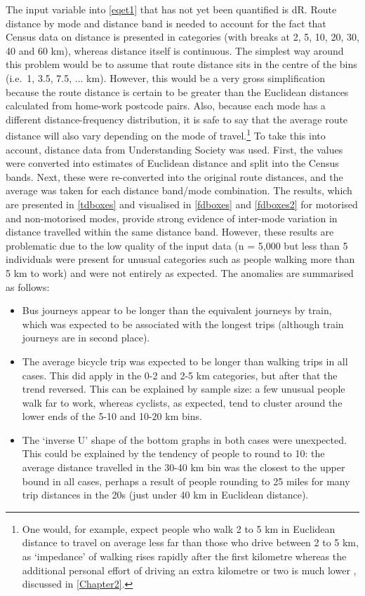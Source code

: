 The input variable into \cref{eqet1} that has not yet been quantified is
dR. Route distance by mode and distance band
is needed to account for the fact that Census data on distance is presented in
categories (with breaks at 2, 5, 10, 20, 30, 40 and 60 km), whereas distance
itself is continuous. The simplest way around this problem would be to
assume that route distance sits in the centre of the bins (i.e.~1, 3.5, 7.5, ...
km). However, this would be a very gross simplification because the route distance
is certain to be greater than the Euclidean distances calculated from
home-work postcode pairs. Also, because each mode has a different
distance-frequency distribution,
it is safe to say that the average route distance will also vary depending
on the mode of travel.\footnote{One would, for example,
expect people who walk 2 to 5
km in Euclidean distance to travel on average less far than those who drive
between 2 to 5 km, as `impedance' of walking rises rapidly after the first
kilometre whereas the additional personal effort of driving
an extra kilometre or two is much lower
\citep{Iacono2010}, discussed in \cref{Chapter2}.
}
To take this into account, distance data from Understanding Society was used.
First, the values were converted into estimates of Euclidean distance and
split into the Census bands. Next, these were re-converted into the original
route distances, and the average was taken for each distance band/mode
combination. The results, which are presented in \cref{tdboxes} and visualised in 
\cref{fdboxes} and \cref{fdboxes2} for motorised and non-motorised modes,
provide strong evidence of inter-mode variation in distance travelled within
the same distance band. However, these results are problematic due to the
low quality of the input data (n = 5,000 but less than 5 individuals
were present for unusual
categories such as people walking more than 5 km to work) and were not entirely
as expected. The anomalies are summarised as follows:
\begin{itemize}
 \item Bus journeys appear to be longer than the equivalent journeys by train,
 which was expected to be associated with the longest trips (although train
 journeys are in second place).
 \item The average bicycle trip was expected to be longer than walking trips
 in all cases. This did apply in the 0-2 and 2-5 km categories, but after that
 the trend reversed. This can be explained by sample size: a few unusual people
 walk far to work, whereas cyclists, as expected, tend to cluster around the lower
 ends of the 5-10 and 10-20 km bins.
 \item The `inverse U' shape of the bottom graphs in both cases were unexpected.
 This could be explained by the tendency of people to round to 10: the
 average distance travelled in the 30-40 km bin was the closest to the upper
 bound in all cases, perhaps a result of people rounding to 25 miles for many
 trip distances in the 20s (just under 40 km in Euclidean distance).
\end{itemize}
